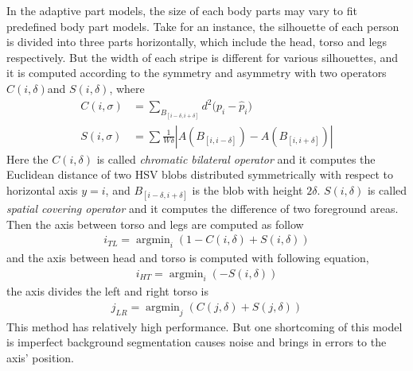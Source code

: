 In the adaptive part models, the size of each body parts may vary to fit predefined body part models. Take \cite{SDALF} for an instance, the silhouette of each person is divided into three parts horizontally, which include the head, torso and legs respectively. But the width of each stripe is different for various silhouettes, and it is computed according to the symmetry and asymmetry with two operators $C(i, \delta) $and $S(i,\delta)$, where 
\begin{equation}
\begin{aligned}
C(i,\sigma) & = \sum_{B_{[i-\delta, i+\delta]}}{d^2(p_i-{\hat{p}_i)}} \\
S(i,\sigma) &= \sum{\frac{1}{W\delta}|A(B_{[i,i-\delta]}) - A(B_{[i,i+\delta]})|}
\end{aligned}
\end{equation}
Here the $C(i, \delta)$ is called \emph{chromatic bilateral operator} and it computes the Euclidean distance of two HSV blobs distributed symmetrically with respect to horizontal axis $y = i$, and $B_{[i-\delta, i+\delta]}$ is the blob with height $2\delta$. $S(i,\delta)$ is called \emph{spatial covering operator} and it computes the difference of two foreground areas. Then the axis between torso and legs are computed as follow
\begin{equation}
\begin{aligned}
i_{TL} = \mathop{\arg\min}_i(1-C(i,\delta)+S(i,\delta))
\end{aligned}
\end{equation}
and the axis  between head and torso is computed with following equation,
\begin{equation}
\begin{aligned}
i_{HT} = \mathop{\arg\min}_i(-S(i,\delta))
\end{aligned}
\end{equation}
the axis divides the left and right torso is
\begin{equation}
\begin{aligned}
j_{LR} = \mathop{\arg\min}_j(C(j,\delta)+S(j,\delta))
\end{aligned}
\end{equation}
This method has relatively high performance. But one shortcoming of this model is imperfect background segmentation causes noise and brings in errors to the axis' position. \\
